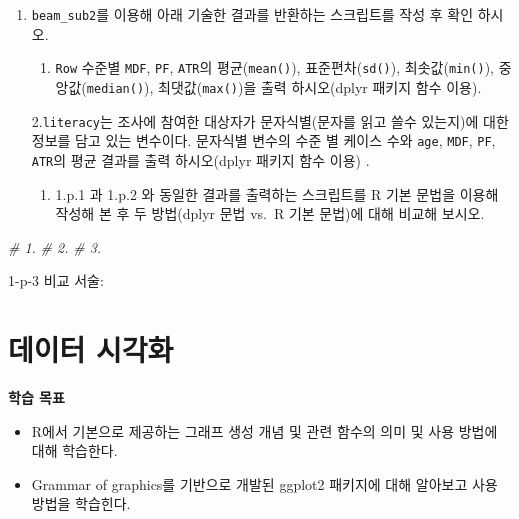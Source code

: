 \documentclass[
  11pt,
]{krantz}
\makeatletter
\newenvironment{Shaded}{\begin{snugshade}}{\end{snugshade}}
\newcommand{\CommentTok}[1]{\textcolor[rgb]{0.37,0.37,0.37}{\textit{#1}}}
\providecommand{\tightlist}{%
  \setlength{\itemsep}{0pt}\setlength{\parskip}{0pt}}
\newenvironment{kframe}{%
\medskip{}
\setlength{\fboxsep}{.8em}
 \def\at@end@of@kframe{}%
 \ifinner\ifhmode%
  \def\at@end@of@kframe{\end{minipage}}%
  \begin{minipage}{\columnwidth}%
 \fi\fi%
 \def\FrameCommand##1{\hskip\@totalleftmargin \hskip-\fboxsep
 \colorbox{shadecolor}{##1}\hskip-\fboxsep
     \hskip-\linewidth \hskip-\@totalleftmargin \hskip\columnwidth}%
 \MakeFramed {\advance\hsize-\width
   \@totalleftmargin\z@ \linewidth\hsize
   \@setminipage}}%
 {\par\unskip\endMakeFramed%
 \at@end@of@kframe}
\renewenvironment{quote}{\begin{kframe}}{\end{kframe}}
\let\BeginKnitrBlock\begin \let\EndKnitrBlock\end
\makeatother
\begin{document}
\begin{enumerate}
\def\labelenumi{\alph{enumi}.}
\setcounter{enumi}{15}
\item
  \texttt{beam\_sub2}를 이용해 아래 기술한 결과를 반환하는 스크립트를 작성 후 확인 하시오.

  \begin{enumerate}
  \def\labelenumii{\arabic{enumii}.}
  \tightlist
  \item
    \texttt{Row} 수준별 \texttt{MDF}, \texttt{PF}, \texttt{ATR}의 평균(\texttt{mean()}), 표준편차(\texttt{sd()}), 최솟값(\texttt{min()}), 중앙값(\texttt{median()}), 최댓값(\texttt{max()})을 출력 하시오(dplyr 패키지 함수 이용).
  \end{enumerate}

  2.\texttt{literacy}는 조사에 참여한 대상자가 문자식별(문자를 읽고 쓸수 있는지)에 대한 정보를 담고 있는 변수이다. 문자식별 변수의 수준 별 케이스 수와 \texttt{age}, \texttt{MDF}, \texttt{PF}, \texttt{ATR}의 평균 결과를 출력 하시오(dplyr 패키지 함수 이용) .

  \begin{enumerate}
  \def\labelenumii{\arabic{enumii}.}
  \setcounter{enumii}{2}
  \tightlist
  \item
    1.p.1 과 1.p.2 와 동일한 결과를 출력하는 스크립트를 R 기본 문법을 이용해 작성해 본 후 두 방법(dplyr 문법 vs.~R 기본 문법)에 대해 비교해 보시오.
  \end{enumerate}
\end{enumerate}

\footnotesize

\begin{Shaded}
\begin{Highlighting}[]
\CommentTok{# 1.}
\CommentTok{# 2.}
\CommentTok{# 3.}
\end{Highlighting}
\end{Shaded}

\normalsize

\begin{quote}
1-p-3 비교 서술:
\end{quote}

\hypertarget{ch-data-visualization}{%
\chapter{데이터 시각화}\label{ch-data-visualization}}

\footnotesize

\BeginKnitrBlock{rmdimportant}
\textbf{학습 목표}

\begin{itemize}
\tightlist
\item
  R에서 기본으로 제공하는 그래프 생성 개념 및 관련 함수의 의미 및 사용 방법에 대해 학습한다.
\item
  Grammar of graphics를 기반으로 개발된 ggplot2 패키지에 대해 알아보고 사용 방법을 학습힌다.
\end{itemize}
\EndKnitrBlock{rmdimportant}
\end{document}

